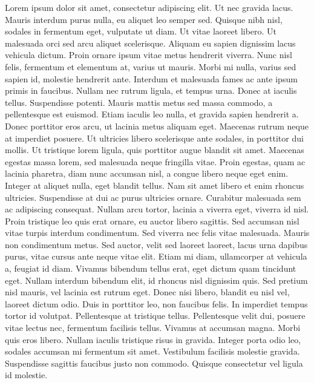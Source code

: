 \documentclass{article}
\begin{document}
\begin{pages}
\begin{Leftside}
\pend
\endnumbering
\end{Leftside}

\begin{Rightside}
\beginnumbering
\pstart
Lorem ipsum dolor sit amet, consectetur adipiscing elit. Ut nec gravida lacus. Mauris interdum purus nulla, eu aliquet leo semper sed. Quisque nibh nisl, sodales in fermentum eget, vulputate ut diam. Ut vitae laoreet libero. Ut malesuada orci sed arcu aliquet scelerisque. Aliquam eu sapien dignissim lacus vehicula dictum. Proin ornare ipsum vitae metus hendrerit viverra. Nunc nisl felis, fermentum et elementum at, varius ut mauris. Morbi mi nulla, varius sed sapien id, molestie hendrerit ante. Interdum et malesuada fames ac ante ipsum primis in faucibus. Nullam nec rutrum ligula, et tempus urna. Donec at iaculis tellus. Suspendisse potenti. Mauris mattis metus sed massa commodo, a pellentesque est euismod. Etiam iaculis leo nulla, et gravida sapien hendrerit a.
Donec porttitor eros arcu, ut lacinia metus aliquam eget. Maecenas rutrum neque at imperdiet posuere. Ut ultricies libero scelerisque ante sodales, in porttitor dui mollis. Ut tristique lorem ligula, quis porttitor augue blandit sit amet. Maecenas egestas massa lorem, sed malesuada neque fringilla vitae. Proin egestas, quam ac lacinia pharetra, diam nunc accumsan nisl, a congue libero neque eget enim. Integer at aliquet nulla, eget blandit tellus. Nam sit amet libero et enim rhoncus ultricies. Suspendisse at dui ac purus ultricies ornare. Curabitur malesuada sem ac adipiscing consequat. Nullam arcu tortor, lacinia a viverra eget, viverra id nisl. Proin tristique leo quis erat ornare, eu auctor libero sagittis.
Sed accumsan nisl vitae turpis interdum condimentum. Sed viverra nec felis vitae malesuada. Mauris non condimentum metus. Sed auctor, velit sed laoreet laoreet, lacus urna dapibus purus, vitae cursus ante neque vitae elit. Etiam mi diam, ullamcorper at vehicula a, feugiat id diam. Vivamus bibendum tellus erat, eget dictum quam tincidunt eget. Nullam interdum bibendum elit, id rhoncus nisl dignissim quis.
Sed pretium nisl mauris, vel lacinia est rutrum eget. Donec nisi libero, blandit eu nisl vel, laoreet dictum odio. Duis in porttitor leo, non faucibus felis. In imperdiet tempus tortor id volutpat. Pellentesque at tristique tellus. Pellentesque velit dui, posuere vitae lectus nec, fermentum facilisis tellus. Vivamus at accumsan magna. Morbi quis eros libero. Nullam iaculis tristique risus in gravida. Integer porta odio leo, sodales accumsan mi fermentum sit amet. Vestibulum facilisis molestie gravida. Suspendisse sagittis faucibus justo non commodo. Quisque consectetur vel ligula id molestie.

\end{Rightside}
\end{pages}
\end{document}
